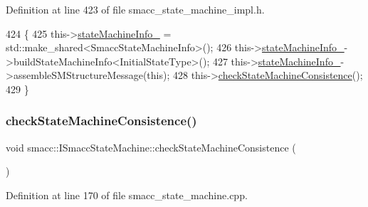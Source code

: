 Definition at line 423 of file smacc\+\_\+state\+\_\+machine\+\_\+impl.\+h.


\begin{DoxyCode}
424 \{
425     this->\hyperlink{classsmacc_1_1ISmaccStateMachine_a0914aa27c3f51374c338d89a32b135d1}{stateMachineInfo\_} = std::make\_shared<SmaccStateMachineInfo>();
426     this->\hyperlink{classsmacc_1_1ISmaccStateMachine_a0914aa27c3f51374c338d89a32b135d1}{stateMachineInfo\_}->buildStateMachineInfo<InitialStateType>();
427     this->\hyperlink{classsmacc_1_1ISmaccStateMachine_a0914aa27c3f51374c338d89a32b135d1}{stateMachineInfo\_}->assembleSMStructureMessage(\textcolor{keyword}{this});
428     this->\hyperlink{classsmacc_1_1ISmaccStateMachine_af34fa8346ae3f52882704422d59b9055}{checkStateMachineConsistence}();
429 \}
\end{DoxyCode}
\mbox{\label{classsmacc_1_1ISmaccStateMachine_af34fa8346ae3f52882704422d59b9055}} 
\subsubsection{\texorpdfstring{check\+State\+Machine\+Consistence()}{checkStateMachineConsistence()}}
{\footnotesize\ttfamily void smacc\+::\+I\+Smacc\+State\+Machine\+::check\+State\+Machine\+Consistence (\begin{DoxyParamCaption}{ }\end{DoxyParamCaption})\hspace{0.3cm}{\ttfamily [protected]}}



Definition at line 170 of file smacc\+\_\+state\+\_\+machine.\+cpp.


